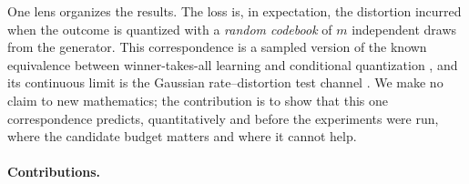 One lens organizes the results. The \nom{} loss is, in expectation, the distortion incurred when the outcome is quantized with a \emph{random codebook} of $m$ independent draws from the generator. This correspondence is a sampled version of the known equivalence between winner-takes-all learning and conditional quantization \citep{rupprecht2017mhp,letzelter2024wta,perera2024amcl}, and its continuous limit is the Gaussian rate--distortion test channel \citep{shannon1959coding,cover2006elements}. We make no claim to new mathematics; the contribution is to show that this one correspondence predicts, quantitatively and before the experiments were run, where the candidate budget matters and where it cannot help.

\paragraph{Contributions.}
